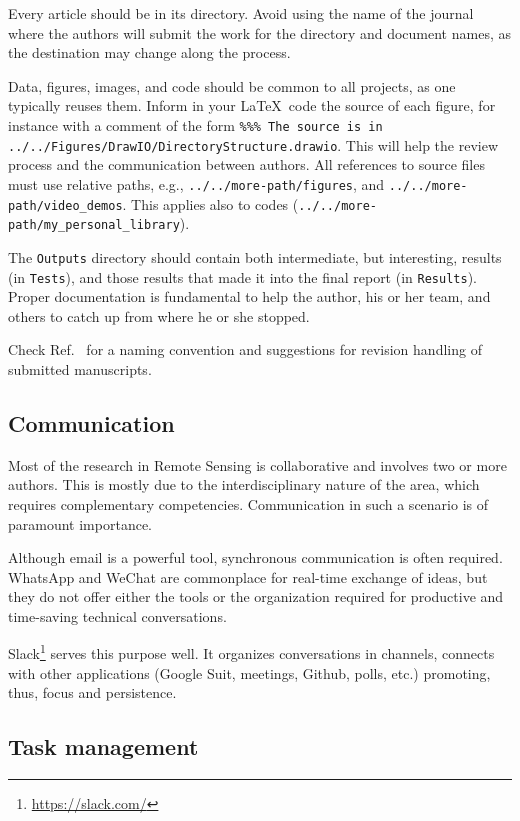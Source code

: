 \documentclass[journal,twoside]{IEEEtran}
\begin{document}
Every article should be in its directory.
Avoid using the name of the journal where the authors will submit the work for the directory and document names, as the destination may change along the process.

Data, figures, images, and code should be common to all projects, as one typically reuses them.
Inform in your \LaTeX\ code the source of each figure, for instance with a comment of the form \texttt{\%\%\% The source is in ../../Figures/DrawIO/DirectoryStructure.drawio}.
This will help the review process and the communication between authors. 
All references to source files must use relative paths, e.g., \texttt{../../more-path/figures}, and \texttt{../../more-path/video\_demos}. 
This applies also to codes (\texttt{../../more-path/my\_personal\_library}).


The \verb|Outputs| directory should contain both intermediate, but interesting, results (in \verb|Tests|), and those results that made it into the final report (in \verb|Results|).
Proper documentation is fundamental to help the author, his or her team, and others to catch up from where he or she stopped.    

Check Ref.~\cite{EditorialGRSL2015} for a naming convention and suggestions for revision handling of submitted manuscripts.

\subsection{Communication}

Most of the research in Remote Sensing is collaborative and involves two or more authors.
This is mostly due to the interdisciplinary nature of the area, which requires complementary competencies.
Communication in such a scenario is of paramount importance.

Although email is a powerful tool, synchronous communication is often required.
WhatsApp and WeChat are commonplace for real-time exchange of ideas, but they do not offer either the tools or the organization required for productive and time-saving technical conversations.

Slack\footnote{\url{https://slack.com/}} serves this purpose well.
It organizes conversations in channels, connects with other applications (Google Suit, meetings, Github, polls, etc.) promoting, thus, focus and persistence.

\subsection{Task management}
\end{document}
